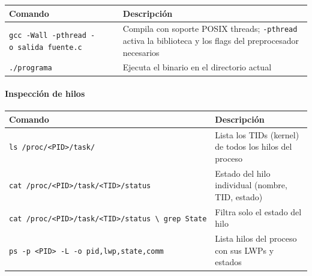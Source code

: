 \documentclass[
  spanish,
]{article}
\newcounter{none} %
\begin{document}
{\def\LTcaptype{none} %
\begin{longtable}[]{@{}
  >{\raggedright\arraybackslash}p{}
  >{\raggedright\arraybackslash}p{}@{}}
\toprule\noalign{}
\begin{minipage}[b]{\linewidth}\raggedright
Comando
\end{minipage} & \begin{minipage}[b]{\linewidth}\raggedright
Descripción
\end{minipage} \\
\midrule\noalign{}
\endhead
\bottomrule\noalign{}
\endlastfoot
\texttt{gcc\ -Wall\ -pthread\ -o\ salida\ fuente.c} & Compila con
soporte POSIX threads; \texttt{-pthread} activa la biblioteca y los
flags del preprocesador necesarios \\
\texttt{./programa} & Ejecuta el binario en el directorio actual \\
\end{longtable}
}

\paragraph{Inspección de hilos}\label{inspecciuxf3n-de-hilos}

{\def\LTcaptype{none} %
\begin{longtable}[]{@{}
  >{\raggedright\arraybackslash}p{}
  >{\raggedright\arraybackslash}p{}@{}}
\toprule\noalign{}
\begin{minipage}[b]{\linewidth}\raggedright
Comando
\end{minipage} & \begin{minipage}[b]{\linewidth}\raggedright
Descripción
\end{minipage} \\
\midrule\noalign{}
\endhead
\bottomrule\noalign{}
\endlastfoot
\texttt{ls\ /proc/\textless{}PID\textgreater{}/task/} & Lista los TIDs
(kernel) de todos los hilos del proceso \\
\texttt{cat\ /proc/\textless{}PID\textgreater{}/task/\textless{}TID\textgreater{}/status}
& Estado del hilo individual (nombre, TID, estado) \\
\texttt{cat\ /proc/\textless{}PID\textgreater{}/task/\textless{}TID\textgreater{}/status\ \textbackslash{}\textbar{}\ grep\ State}
& Filtra solo el estado del hilo \\
\texttt{ps\ -p\ \textless{}PID\textgreater{}\ -L\ -o\ pid,lwp,state,comm}
& Lista hilos del proceso con sus LWPs y estados \\
\end{longtable}
}
\end{document}
